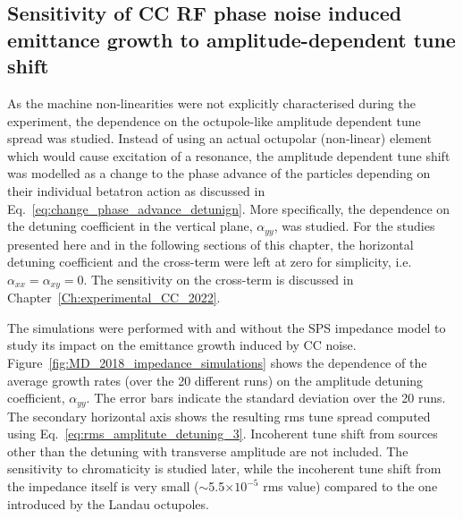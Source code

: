 \subsection{Sensitivity of CC RF phase noise induced emittance growth to amplitude-dependent tune shift}\label{subsec:amplitude_detuning_scan}

As the machine non-linearities were not explicitly characterised during the experiment, the dependence on the octupole-like amplitude dependent tune spread was studied. Instead of using an actual octupolar (non-linear) element which would cause excitation of a resonance, %
the amplitude dependent tune shift was modelled as a change to the phase advance of the particles depending on their individual betatron action as discussed in Eq.~\eqref{eq:change_phase_advance_detunign}. More specifically, the dependence on the detuning coefficient in the vertical plane, $\alpha_{yy}$, was studied. %
For the studies presented here and in the following sections of this chapter, the horizontal detuning coefficient and the cross-term were left at zero for simplicity, i.e.~$\alpha_{xx} = \alpha_{xy} = 0$. %
The sensitivity on the cross-term is discussed in Chapter~\ref{Ch:experimental_CC_2022}.

The simulations were performed with and without the SPS impedance model to study its impact on the emittance growth induced by CC noise. Figure~\ref{fig:MD_2018_impedance_simulations} shows the dependence of the average growth rates (over the 20 different runs) on the amplitude detuning coefficient, $\alpha_{yy}$. The error bars indicate the standard deviation over the 20 runs. The secondary horizontal axis shows the resulting rms tune spread computed using Eq.~\eqref{eq:rms_amplitute_detuning_3}. Incoherent tune shift from sources other than the detuning with transverse amplitude are not included. The sensitivity to chromaticity is studied later, while the incoherent tune shift from the impedance itself is very small ($\sim$5.5$\times10^{-5}$ rms value) compared to the one introduced by the Landau octupoles. %

